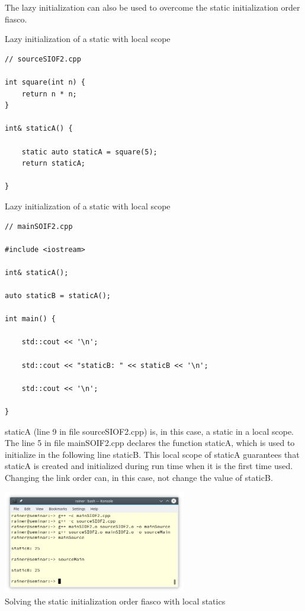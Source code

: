 The lazy initialization can also be used to overcome the static initialization order fiasco.

\noindent
Lazy initialization of a static with local scope
\begin{lstlisting}[style=styleCXX]
// sourceSIOF2.cpp

int square(int n) {
	return n * n;
}

int& staticA() {
	
	static auto staticA = square(5);
	return staticA;

}
\end{lstlisting}

\noindent
Lazy initialization of a static with local scope
\begin{lstlisting}[style=styleCXX]
// mainSOIF2.cpp

#include <iostream>

int& staticA();

auto staticB = staticA();

int main() {
	
	std::cout << '\n';
	
	std::cout << "staticB: " << staticB << '\n';
	
	std::cout << '\n';

}
\end{lstlisting}

staticA (line 9 in file sourceSIOF2.cpp) is, in this case, a static in a local scope. The line 5 in file mainSOIF2.cpp declares the function staticA, which is used to initialize in the following line staticB. This local scope of staticA guarantees that staticA is created and initialized during run time when it is the first time used. Changing the link order can, in this case, not change the value of staticB.

\begin{center}
\includegraphics[width=0.6\textwidth]{content/3/chapter4/images/38.png}\\
Solving the static initialization order fiasco with local statics
\end{center}

